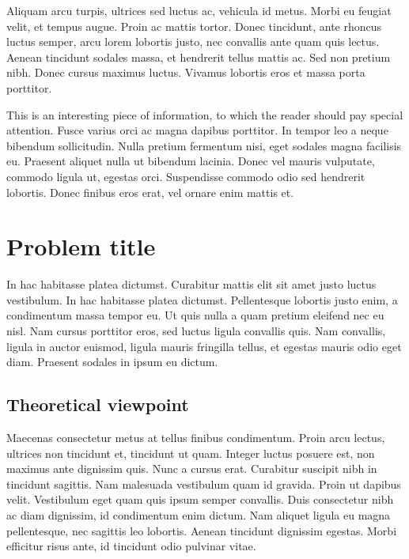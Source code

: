 \documentclass{article}
\begin{document}
Aliquam arcu turpis, ultrices sed luctus ac, vehicula id metus. Morbi eu feugiat velit, et tempus augue. Proin ac mattis tortor. Donec tincidunt, ante rhoncus luctus semper, arcu lorem lobortis justo, nec convallis ante quam quis lectus. Aenean tincidunt sodales massa, et hendrerit tellus mattis ac. Sed non pretium nibh. Donec cursus maximus luctus. Vivamus lobortis eros et massa porta porttitor.

\begin{info} %
	This is an interesting piece of information, to which the reader should pay special attention. Fusce varius orci ac magna dapibus porttitor. In tempor leo a neque bibendum sollicitudin. Nulla pretium fermentum nisi, eget sodales magna facilisis eu. Praesent aliquet nulla ut bibendum lacinia. Donec vel mauris vulputate, commodo ligula ut, egestas orci. Suspendisse commodo odio sed hendrerit lobortis. Donec finibus eros erat, vel ornare enim mattis et.
\end{info}


\section{Problem title} %

In hac habitasse platea dictumst. Curabitur mattis elit sit amet justo luctus vestibulum. In hac habitasse platea dictumst. Pellentesque lobortis justo enim, a condimentum massa tempor eu. Ut quis nulla a quam pretium eleifend nec eu nisl. Nam cursus porttitor eros, sed luctus ligula convallis quis. Nam convallis, ligula in auctor euismod, ligula mauris fringilla tellus, et egestas mauris odio eget diam. Praesent sodales in ipsum eu dictum.


\subsection{Theoretical viewpoint}

Maecenas consectetur metus at tellus finibus condimentum. Proin arcu lectus, ultrices non tincidunt et, tincidunt ut quam. Integer luctus posuere est, non maximus ante dignissim quis. Nunc a cursus erat. Curabitur suscipit nibh in tincidunt sagittis. Nam malesuada vestibulum quam id gravida. Proin ut dapibus velit. Vestibulum eget quam quis ipsum semper convallis. Duis consectetur nibh ac diam dignissim, id condimentum enim dictum. Nam aliquet ligula eu magna pellentesque, nec sagittis leo lobortis. Aenean tincidunt dignissim egestas. Morbi efficitur risus ante, id tincidunt odio pulvinar vitae.
\end{document}
